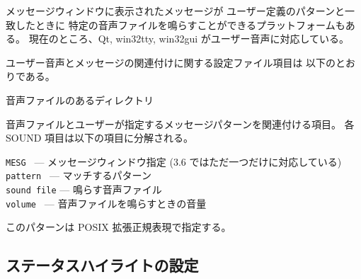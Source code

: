 メッセージウィンドウに表示されたメッセージが
ユーザー定義のパターンと一致したときに
特定の音声ファイルを鳴らすことができるプラットフォームもある。
現在のところ、Qt, win32tty, win32gui がユーザー音声に対応している。

ユーザー音声とメッセージの関連付けに関する設定ファイル項目は
以下のとおりである。

\blist{}
\item[\ib{SOUNDDIR}]
音声ファイルのあるディレクトリ
\item[\ib{SOUND}]
音声ファイルとユーザーが指定するメッセージパターンを関連付ける項目。
各 SOUND 項目は以下の項目に分解される。

{\tt MESG      } --- メッセージウィンドウ指定 (3.6 ではただ一つだけに対応している)\\
{\tt pattern   } --- マッチするパターン\\
{\tt sound file} --- 鳴らす音声ファイル\\
{\tt volume    } --- 音声ファイルを鳴らすときの音量
\elist

このパターンは POSIX 拡張正規表現で指定する。

\subsection*{ステータスハイライトの設定}

